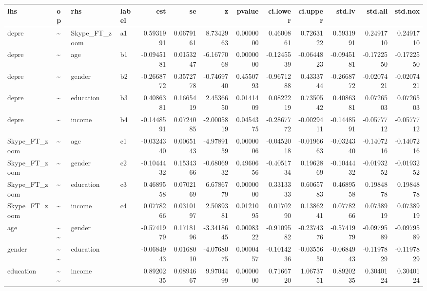 \documentclass[
]{article}
\begin{document}
\begin{table}[!h]
\centering
\begin{tabular}[t]{llllrrrrrrrrr}
\toprule
lhs & op & rhs & label & est & se & z & pvalue & ci.lower & ci.upper & std.lv & std.all & std.nox\\
\midrule
depre & \textasciitilde{} & Skype\_FT\_zoom & a1 & 0.5931991 & 0.0679161 & 8.7342963 & 0.0000000 & 0.4600861 & 0.7263122 & 0.5931991 & 0.2491710 & 0.2491710\\
depre & \textasciitilde{} & age & b1 & -0.0945181 & 0.0153247 & -6.1677068 & 0.0000000 & -0.1245539 & -0.0644823 & -0.0945181 & -0.1722550 & -0.1722550\\
depre & \textasciitilde{} & gender & b2 & -0.2668772 & 0.3572778 & -0.7469740 & 0.4550793 & -0.9671288 & 0.4333744 & -0.2668772 & -0.0207421 & -0.0207421\\
depre & \textasciitilde{} & education & b3 & 0.4086381 & 0.1665419 & 2.4536650 & 0.0141409 & 0.0822219 & 0.7350542 & 0.4086381 & 0.0726503 & 0.0726503\\
depre & \textasciitilde{} & income & b4 & -0.1448591 & 0.0724085 & -2.0005819 & 0.0454375 & -0.2867772 & -0.0029411 & -0.1448591 & -0.0577712 & -0.0577712\\
\addlinespace
Skype\_FT\_zoom & \textasciitilde{} & age & c1 & -0.0324340 & 0.0065143 & -4.9789159 & 0.0000006 & -0.0452018 & -0.0196663 & -0.0324340 & -0.1407216 & -0.1407216\\
Skype\_FT\_zoom & \textasciitilde{} & gender & c2 & -0.1044432 & 0.1534366 & -0.6806932 & 0.4960656 & -0.4051734 & 0.1962869 & -0.1044432 & -0.0193252 & -0.0193252\\
Skype\_FT\_zoom & \textasciitilde{} & education & c3 & 0.4689558 & 0.0702169 & 6.6786779 & 0.0000000 & 0.3313333 & 0.6065783 & 0.4689558 & 0.1984878 & 0.1984878\\
Skype\_FT\_zoom & \textasciitilde{} & income & c4 & 0.0778266 & 0.0310197 & 2.5089381 & 0.0121095 & 0.0170290 & 0.1386241 & 0.0778266 & 0.0738919 & 0.0738919\\
age & \textasciitilde{}\textasciitilde{} & gender &  & -0.5741979 & 0.1718196 & -3.3418645 & 0.0008322 & -0.9109582 & -0.2374376 & -0.5741979 & -0.0979589 & -0.0979589\\
\addlinespace
gender & \textasciitilde{}\textasciitilde{} & education &  & -0.0684943 & 0.0168010 & -4.0768075 & 0.0000457 & -0.1014236 & -0.0355650 & -0.0684943 & -0.1197829 & -0.1197829\\
education & \textasciitilde{}\textasciitilde{} & income &  & 0.8920235 & 0.0894667 & 9.9704499 & 0.0000000 & 0.7166720 & 1.0673751 & 0.8920235 & 0.3040124 & 0.3040124\\

\end{tabular}
\end{table}
\end{document}
